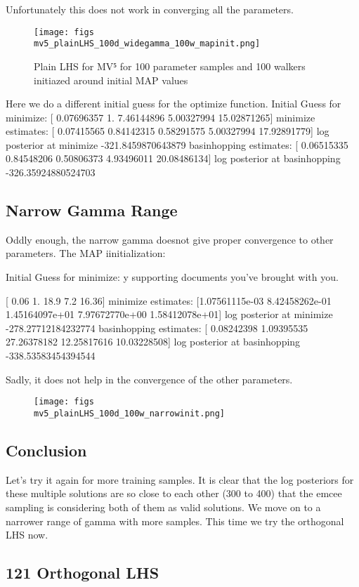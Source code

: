 \documentclass{article}
\begin{document}
Unfortunately this does not work in converging all the parameters. 

\begin{figure}
\centering
\texttt{[image: figs\\mv5\_plainLHS\_100d\_widegamma\_100w\_mapinit.png]}
\caption{Plain LHS for MV⁵ for 100 parameter samples and 100 walkers initiazed around initial MAP values}
\end{figure}


Here we do a different initial guess for the optimize function.
Initial Guess for minimize:  [ 0.07696357  1.          7.46144896  5.00327994 15.02871265]
minimize estimates:  [ 0.07415565  0.84142315  0.58291575  5.00327994 17.92891779]
log posterior at minimize -321.8459870643879
basinhopping estimates:  [ 0.06515335  0.84548206  0.50806373  4.93496011 20.08486134]
log posterior at basinhopping -326.35924880524703


\subsection{Narrow Gamma Range}

Oddly enough, the narrow gamma doesnot give proper convergence to other parameters. The MAP iinitialization:

Initial Guess for minimize:  y supporting documents you’ve brought with you.

[ 0.06  1.   18.9   7.2  16.36]
minimize estimates:  [1.07561115e-03 8.42458262e-01 1.45164097e+01 7.97672770e+00  1.58412078e+01]
log posterior at minimize -278.27712184232774
basinhopping estimates:  [ 0.08242398  1.09395535 27.26378182 12.25817616 10.03228508]
log posterior at basinhopping -338.53583454394544

Sadly, it does not help in the convergence of the other parameters.

\begin{figure}
\centering
\texttt{[image: figs\\mv5\_plainLHS\_100d\_100w\_narrowinit.png]}
\end{figure}

\subsection{Conclusion}
Let's try it again for more training samples. It is clear that the log posteriors for these multiple solutions are so close to each other (300 to 400) that the emcee sampling is considering both of them as valid solutions. We move on to a narrower range of gamma with more samples. This time we try the orthogonal LHS now. 

\subsection{121 Orthogonal LHS}
\end{document}
